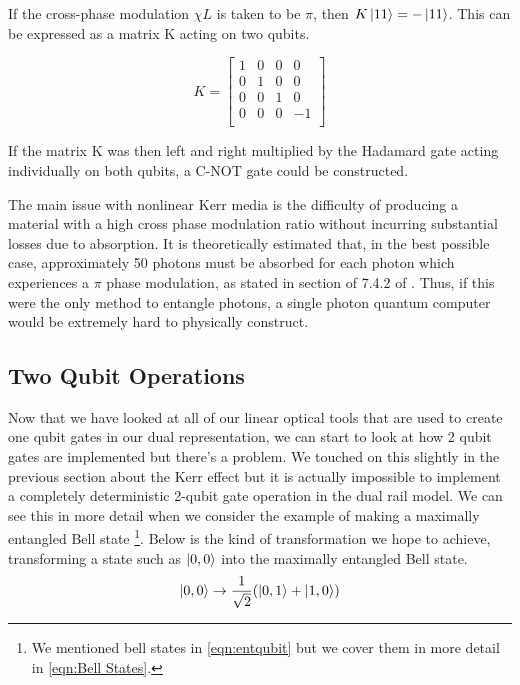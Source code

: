 If the cross-phase modulation $\chi L$ is taken to be $\pi$, then $K \ket{11} =  -\ket{11}$. This can be expressed as a matrix K acting on two qubits.

$$K = \begin{bmatrix}
    1 & 0 & 0 & 0\\
    0 & 1 & 0 & 0\\
    0 & 0 & 1 & 0\\
    0 & 0 & 0 & -1\\
    \end{bmatrix}$$

If the matrix K was then left and right multiplied by the Hadamard gate acting individually on both qubits, a C-NOT gate could be constructed. 

The main issue with nonlinear Kerr media is the difficulty of producing a material with a high cross phase modulation ratio without incurring substantial losses due to absorption. It is theoretically estimated that, in the best possible case, approximately 50 photons must be absorbed for each photon which experiences a $\pi$ phase modulation, as stated in section of 7.4.2 of \cite{nielsen_chuang_2010}. Thus, if this were the only method to entangle photons, a single photon quantum computer would be extremely hard to physically construct.







\subsection{Two Qubit Operations}
Now that we have looked at all of our linear optical tools that are used to create one qubit gates in our dual representation, we can start to look at how 2 qubit gates are implemented but there's a problem. We touched on this slightly in the previous section about the Kerr effect but it is actually impossible to implement a completely deterministic 2-qubit gate operation in the dual rail model\cite{PhysRevA.59.3295}\cite{PhysRevA.62.064301}. We can see this in more detail when we consider the example of making a maximally entangled Bell state \footnote{We mentioned bell states in  \cref{eqn:entqubit} but we cover them in more detail in \ref{eqn:Bell States}.}. Below is the kind of transformation we hope to achieve, transforming a state such as $\ket{0,0}$ into the maximally entangled Bell state.
\begin{equation} \label{bob bell state}
    \ket{0,0} \rightarrow \frac{1}{\sqrt{2}}(\ket{0,1} + \ket{1,0})
\end{equation}

